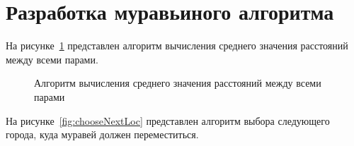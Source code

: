 \clearpage

\section{Разработка муравьиного алгоритма}

На рисунке~\ref{fig:calcQ} представлен алгоритм вычисления среднего значения расстояний между всеми парами.

\begin{figure}[h!]
	\caption{Алгоритм вычисления среднего значения расстояний между всеми парами}
	\label{fig:calcQ}
\end{figure}

\clearpage

На рисунке~\ref{fig:chooseNextLoc} представлен алгоритм выбора следующего города, куда муравей должен переместиться.

